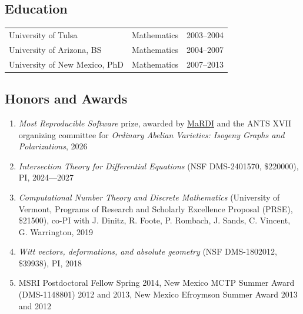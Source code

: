 \documentclass[a4paper,10pt]{article}
\begin{document}
 \subsection*{Education}
 \begin{flushleft}
\begin{tabular}{p{2in} p{1in}p{1in}}
University of Tulsa & Mathematics & 2003--2004 \\
University of Arizona, BS & Mathematics & 2004--2007\\
University of New Mexico, PhD &  Mathematics & 2007--2013
 \end{tabular}
 \end{flushleft}

\subsection*{Honors and Awards}
\begin{enumerate} \addtolength{\itemsep}{-0.5\baselineskip}
	\item \emph{Most Reproducible Software} prize, awarded by \href{https://www.mardi4nfdi.de/}{MaRDI} and the ANTS XVII organizing committee for \emph{Ordinary Abelian Varieties: Isogeny Graphs and Polarizations}, 2026
	\item \emph{Intersection Theory for Differential Equations} (NSF DMS-2401570, \$220000), PI, 2024---2027
	\item \emph{Computational Number Theory and Discrete Mathematics} (University of Vermont, Programs of Research and Scholarly Excellence Proposal (PRSE), \$21500), co-PI with  J. Dinitz, R. Foote, P. Rombach, J. Sands, C. Vincent, G. Warrington, 2019
	\item \emph{Witt vectors, deformations, and absolute geometry} (NSF DMS-1802012, \$39938), PI, 2018
	\item MSRI Postdoctoral Fellow Spring 2014, New Mexico MCTP Summer Award (DMS-1148801) 2012 and 2013,  New Mexico Efroymson Summer Award 2013 and 2012 
\end{enumerate} 
\end{document}
